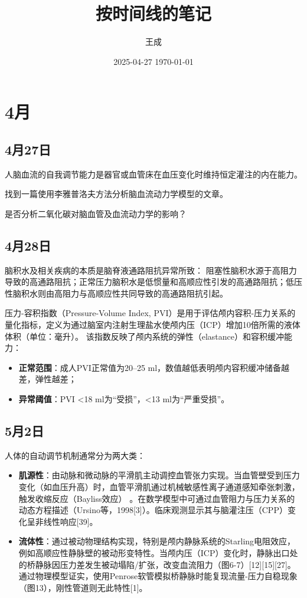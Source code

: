 \documentclass[12pt,a4paper]{article}
\title{按时间线的笔记}
\author{王成}
\date{2025-04-27 \textendash \today}
\begin{document}
\maketitle

\section{4月}

\subsection*{4月27日}

人脑血流的自我调节能力是器官或血管床在血压变化时维持恒定灌注的内在能力\cite{gaoMathematicalConsiderationsModeling1998}。

找到一篇使用李雅普洛夫方法分析脑血流动力学模型的文章\cite{golubevModelingCerebralBlood2022}。

是否分析二氧化碳对脑血管及血流动力学的影响\cite{ursinoModelCerebrovascularReactivity2010}？

\subsection*{4月28日}
脑积水及相关疾病的本质是脑脊液通路阻抗异常所致\cite{egnorQuantitativeModelCerebral2023}：
阻塞性脑积水源于高阻力导致的高通路阻抗；正常压力脑积水是低惯量和高顺应性引发的高通路阻抗；低压性脑积水则由高阻力与高顺应性共同导致的高通路阻抗引起。

压力-容积指数（Pressure-Volume Index, PVI）是用于评估颅内容积-压力关系的量化指标，定义为通过脑室内注射生理盐水使颅内压（ICP）增加10倍所需的液体体积（单位：毫升）\cite{lavinioRelationshipIntracranialPressure2009}。
该指数反映了颅内系统的弹性（elastance）和容积缓冲能力：
\begin{itemize}
    \item \textbf{正常范围}：成人PVI正常值为20–25 ml，数值越低表明颅内容积缓冲储备越差，弹性越差；
    \item \textbf{异常阈值}：PVI <18 ml为“受损”，<13 ml为“严重受损”。
\end{itemize}

\subsection*{5月2日}
人体的自动调节机制通常分为两大类\cite{ficolaPhysicalModelIntracranial2018}：
\begin{itemize}
    \item \textbf{肌源性}：由动脉和微动脉的平滑肌主动调控血管张力实现。当血管壁受到压力变化（如血压升高）时，血管平滑肌通过机械敏感性离子通道感知牵张刺激，触发收缩反应（Bayliss效应）
    。在数学模型中可通过血管阻力与压力关系的动态方程描述（Ursino等，1998[3]）。临床观测显示其与脑灌注压（CPP）变化呈非线性响应[39]。
    \item \textbf{流体性}：通过被动物理结构实现，特别是颅内静脉系统的Starling电阻效应，例如高顺应性静脉壁的被动形变特性。当颅内压（ICP）变化时，静脉出口处的桥静脉因压力差发生被动塌陷/扩张，改变血流阻力（图6-7）[12][15][27]。
    通过物理模型证实，使用Penrose软管模拟桥静脉时能复现流量-压力自稳现象（图13），刚性管道则无此特性[1]。
\end{itemize}
\end{document}
